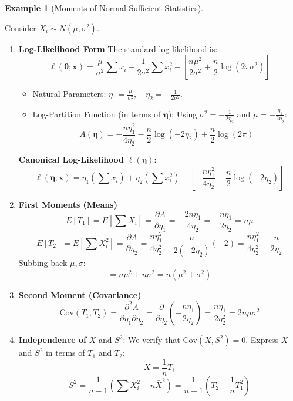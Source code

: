 \documentclass[
  letterpaper,
  DIV=11,
  numbers=noendperiod]{scrreprt}
\providecommand{\tightlist}{%
  \setlength{\itemsep}{0pt}\setlength{\parskip}{0pt}}
\renewcommand{\[}{\begin{equation}}
\renewcommand{\]}{\end{equation}}
\theoremstyle{definition}
\theoremstyle{plain}
\theoremstyle{plain}
\theoremstyle{plain}
\theoremstyle{definition}
\newtheorem{example}{Example}[chapter]
\theoremstyle{plain}
\theoremstyle{remark}
\begin{document}
\begin{example}[Moments of Normal Sufficient
Statistics]\protect\hypertarget{exm-normal-sufficient-moments}{}\label{exm-normal-sufficient-moments}

Consider \(X_i \sim N(\mu, \sigma^2)\).

\begin{enumerate}
\def\labelenumi{\arabic{enumi}.}
\item
  \textbf{Log-Likelihood Form} The standard log-likelihood is: \[
   \ell(\boldsymbol{\theta}; \mathbf{x}) = \frac{\mu}{\sigma^2} \sum x_i - \frac{1}{2\sigma^2} \sum x_i^2 - \left[ \frac{n\mu^2}{2\sigma^2} + \frac{n}{2} \log(2\pi\sigma^2) \right]
   \]

  \begin{itemize}
  \tightlist
  \item
    Natural Parameters:
    \(\eta_1 = \frac{\mu}{\sigma^2}, \quad \eta_2 = -\frac{1}{2\sigma^2}\).
  \item
    Log-Partition Function (in terms of \(\boldsymbol{\eta}\)): Using
    \(\sigma^2 = -\frac{1}{2\eta_2}\) and
    \(\mu = -\frac{\eta_1}{2\eta_2}\): \[
    A(\boldsymbol{\eta}) = -\frac{n \eta_1^2}{4 \eta_2} - \frac{n}{2} \log(-2\eta_2) + \frac{n}{2}\log(2\pi)
    \]
  \end{itemize}

  \textbf{Canonical Log-Likelihood} \(\ell(\boldsymbol{\eta})\): \[
   \ell(\boldsymbol{\eta}; \mathbf{x}) = \eta_1 \left(\sum x_i\right) + \eta_2 \left(\sum x_i^2\right) - \left[ -\frac{n \eta_1^2}{4 \eta_2} - \frac{n}{2} \log(-2\eta_2) \right]
   \]
\item
  \textbf{First Moments (Means)} \[
   E[T_1] = E\left[\sum X_i\right] = \frac{\partial A}{\partial \eta_1} = -\frac{2n\eta_1}{4\eta_2} = -\frac{n\eta_1}{2\eta_2} = n\mu
   \] \[
   E[T_2] = E\left[\sum X_i^2\right] = \frac{\partial A}{\partial \eta_2} = \frac{n\eta_1^2}{4\eta_2^2} - \frac{n}{2(-2\eta_2)}(-2) = \frac{n\eta_1^2}{4\eta_2^2} - \frac{n}{2\eta_2}
   \] Subbing back \(\mu, \sigma\): \[
   = n\mu^2 + n\sigma^2 = n(\mu^2 + \sigma^2)
   \]
\item
  \textbf{Second Moment (Covariance)} \[
   \text{Cov}(T_1, T_2) = \frac{\partial^2 A}{\partial \eta_1 \partial \eta_2} = \frac{\partial}{\partial \eta_2} \left( -\frac{n\eta_1}{2\eta_2} \right) = \frac{n\eta_1}{2\eta_2^2} = 2n\mu\sigma^2
   \]
\item
  \textbf{Independence of} \(\bar{X}\) and \(S^2\): We verify that
  \(\text{Cov}(\bar{X}, S^2) = 0\). Express \(\bar{X}\) and \(S^2\) in
  terms of \(T_1\) and \(T_2\): \[
   \bar{X} = \frac{1}{n} T_1
   \] \[
   S^2 = \frac{1}{n-1} \left( \sum X_i^2 - n\bar{X}^2 \right) = \frac{1}{n-1} \left( T_2 - \frac{1}{n} T_1^2 \right)
   \]


\end{enumerate}
\end{example}
\end{document}

